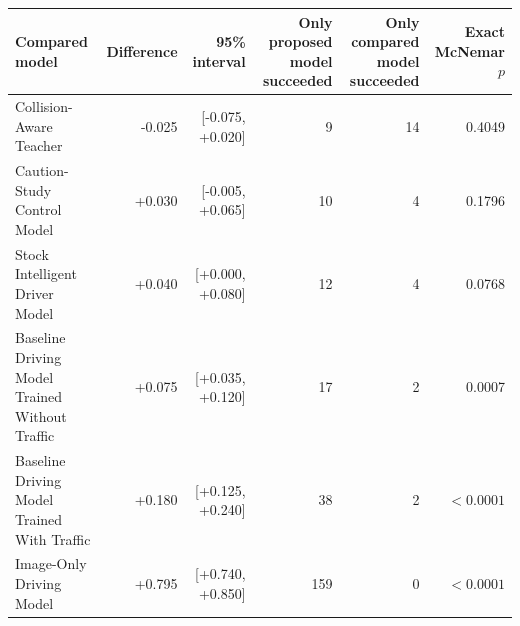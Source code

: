 \begin{tabular}{lrrrrr}\toprule
Compared model & Difference & 95\% interval & Only proposed model succeeded & Only compared model succeeded & Exact McNemar $p$ \\\midrule
Collision-Aware Teacher & -0.025 & [-0.075, +0.020] & 9 & 14 & 0.4049 \\
Caution-Study Control Model & +0.030 & [-0.005, +0.065] & 10 & 4 & 0.1796 \\
Stock Intelligent Driver Model & +0.040 & [+0.000, +0.080] & 12 & 4 & 0.0768 \\
Baseline Driving Model Trained Without Traffic & +0.075 & [+0.035, +0.120] & 17 & 2 & 0.0007 \\
Baseline Driving Model Trained With Traffic & +0.180 & [+0.125, +0.240] & 38 & 2 & $<0.0001$ \\
Image-Only Driving Model & +0.795 & [+0.740, +0.850] & 159 & 0 & $<0.0001$ \\
\bottomrule\end{tabular}
